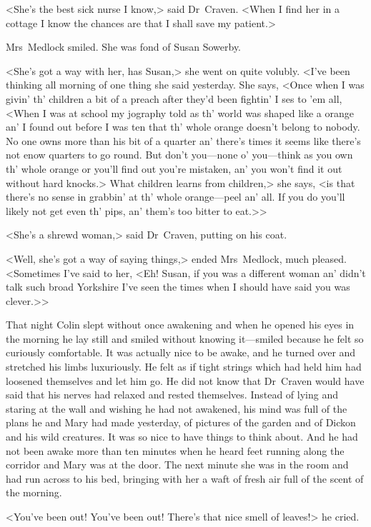 <She's the best sick nurse I know,> said Dr~Craven. <When I find her in a cottage I know the chances are that I shall save my patient.>

Mrs~Medlock smiled. She was fond of Susan Sowerby.

<She's got a way with her, has Susan,> she went on quite volubly. <I've been thinking all morning of one thing she said yesterday. She says, <Once when I was givin' th' children a bit of a preach after they'd been fightin' I ses to 'em all, <When I was at school my jography told as th' world was shaped like a orange an' I found out before I was ten that th' whole orange doesn't belong to nobody. No one owns more than his bit of a quarter an' there's times it seems like there's not enow quarters to go round. But don't you—none o' you—think as you own th' whole orange or you'll find out you're mistaken, an' you won't find it out without hard knocks.> What children learns from children,> she says, <is that there's no sense in grabbin' at th' whole orange—peel an' all. If you do you'll likely not get even th' pips, an' them's too bitter to eat.>>

<She's a shrewd woman,> said Dr~Craven, putting on his coat.

<Well, she's got a way of saying things,> ended Mrs~Medlock, much pleased. <Sometimes I've said to her, <Eh! Susan, if you was a different woman an' didn't talk such broad Yorkshire I've seen the times when I should have said you was clever.>>

That night Colin slept without once awakening and when he opened his eyes in the morning he lay still and smiled without knowing it—smiled because he felt so curiously comfortable. It was actually nice to be awake, and he turned over and stretched his limbs luxuriously. He felt as if tight strings which had held him had loosened themselves and let him go. He did not know that Dr~Craven would have said that his nerves had relaxed and rested themselves. Instead of lying and staring at the wall and wishing he had not awakened, his mind was full of the plans he and Mary had made yesterday, of pictures of the garden and of Dickon and his wild creatures. It was so nice to have things to think about. And he had not been awake more than ten minutes when he heard feet running along the corridor and Mary was at the door. The next minute she was in the room and had run across to his bed, bringing with her a waft of fresh air full of the scent of the morning.

<You've been out! You've been out! There's that nice smell of leaves!> he cried.

